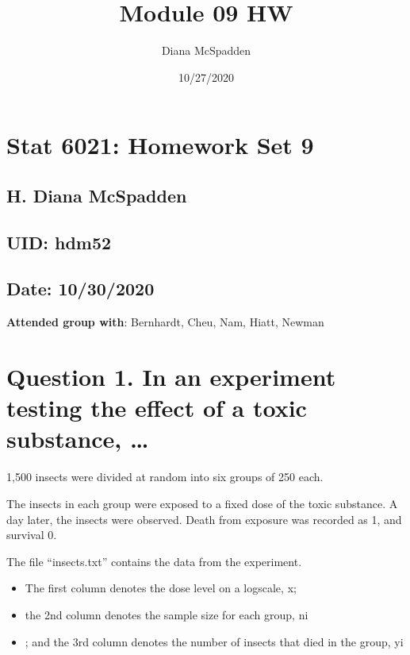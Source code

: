 \documentclass[
]{article}
\title{Module 09 HW}
\author{Diana McSpadden}
\date{10/27/2020}
\providecommand{\tightlist}{%
  \setlength{\itemsep}{0pt}\setlength{\parskip}{0pt}}
\begin{document}
\maketitle

\hypertarget{stat-6021-homework-set-9}{%
\section{Stat 6021: Homework Set 9}\label{stat-6021-homework-set-9}}

\hypertarget{h.-diana-mcspadden}{%
\subsection{H. Diana McSpadden}\label{h.-diana-mcspadden}}

\hypertarget{uid-hdm52}{%
\subsection{UID: hdm52}\label{uid-hdm52}}

\hypertarget{date-10302020}{%
\subsection{Date: 10/30/2020}\label{date-10302020}}

\textbf{Attended group with}: Bernhardt, Cheu, Nam, Hiatt, Newman

\hypertarget{question-1.-in-an-experiment-testing-the-effect-of-a-toxic-substance}{%
\section{Question 1. In an experiment testing the effect of a toxic
substance,
\ldots{}}\label{question-1.-in-an-experiment-testing-the-effect-of-a-toxic-substance}}

1,500 insects were divided at random into six groups of 250 each.

The insects in each group were exposed to a fixed dose of the toxic
substance. A day later, the insects were observed. Death from exposure
was recorded as 1, and survival 0.

The file ``insects.txt'' contains the data from the experiment.

\begin{itemize}
\tightlist
\item
  The first column denotes the dose level on a logscale, x;
\item
  the 2nd column denotes the sample size for each group, ni
\item
  ; and the 3rd column denotes the number of insects that died in the
  group, yi
\end{itemize}
\end{document}
